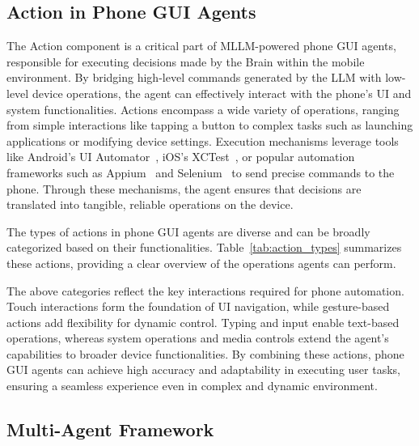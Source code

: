 \subsection{Action in Phone GUI Agents}
\label{subsec:action}

The Action component is a critical part of MLLM-powered phone GUI agents, responsible for executing decisions made by the Brain within the mobile environment. By bridging high-level commands generated by the LLM with low-level device operations, the agent can effectively interact with the phone’s UI and system functionalities. Actions encompass a wide variety of operations, ranging from simple interactions like tapping a button to complex tasks such as launching applications or modifying device settings. Execution mechanisms leverage tools like Android's UI Automator~\cite{patil2016enhanced}, iOS's XCTest~\cite{lodi2021xctest}, or popular automation frameworks such as Appium~\cite{singh2014automated} and Selenium~\cite{gundecha2015selenium,sinclairrole} to send precise commands to the phone. Through these mechanisms, the agent ensures that decisions are translated into tangible, reliable operations on the device.

The types of actions in phone GUI agents are diverse and can be broadly categorized based on their functionalities. Table~\ref{tab:action_types} summarizes these actions, providing a clear overview of the operations agents can perform.


The above categories reflect the key interactions required for phone automation. Touch interactions form the foundation of UI navigation, while gesture-based actions add flexibility for dynamic control. Typing and input enable text-based operations, whereas system operations and media controls extend the agent's capabilities to broader device functionalities. By combining these actions, phone GUI agents can achieve high accuracy and adaptability in executing user tasks, ensuring a seamless experience even in complex and dynamic environment.


\subsection{Multi-Agent Framework}
\label{subsec:mult_agent}

